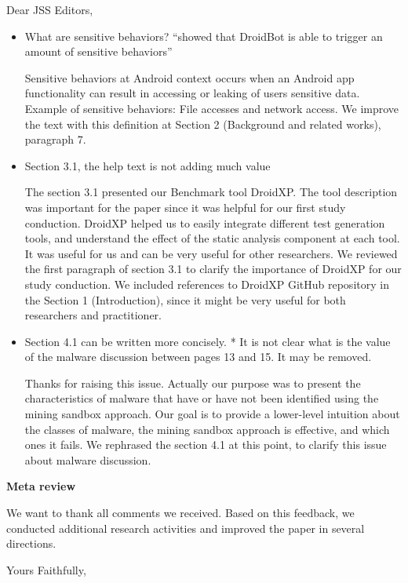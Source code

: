 \documentclass[12pt,english]{scrartcl}
\begin{document}
\begin{letter}{Dear JSS Editors,}
\begin{itemize}
\vspace{0.2cm}

\item What are sensitive behaviors? ``showed that DroidBot is able to trigger an amount of sensitive behaviors''

\vspace{0.2cm}

{\color{blue}{\bf Answer.} Sensitive behaviors at Android context occurs when an Android app functionality can result in accessing or leaking of users sensitive data. Example of sensitive behaviors: File accesses and network access. We improve the text with this definition at Section 2 (Background and related works), paragraph 7.}

\vspace{0.2cm}

\item Section 3.1, the help text is not adding much value

\vspace{0.2cm}

{\color{blue}{\bf Answer.} The section 3.1 presented our Benchmark tool DroidXP. The tool description was important for the paper since it was helpful for our first study conduction. DroidXP helped us to easily integrate different test generation tools, and understand the effect of the static analysis component at each tool. It was useful for us and can be very useful for other researchers. We reviewed the first paragraph of section 3.1 to clarify the importance of DroidXP for our study conduction. We included references to DroidXP GitHub repository in the Section 1 (Introduction), since it might be very useful for both researchers and practitioner.}


\vspace{0.2cm}

\item Section 4.1 can be written more concisely.
* It is not clear what is the value of the malware discussion between pages 13 and 15. It may be removed.

\vspace{0.2cm}

{\color{blue}{\bf Answer.} Thanks for raising this issue. Actually our purpose was to present the characteristics of malware that have or have not been identified using the mining sandbox approach. Our goal is to provide a lower-level intuition about the classes of malware, the mining sandbox approach is effective, and which ones it fails. We rephrased the section 4.1 at this point, to clarify this issue about malware discussion.}


\end{itemize}



{\bf Meta review}

We want to thank all comments we received. Based on this feedback, we conducted additional research activities and improved the paper in several directions.

\closing{Yours Faithfully,}





\end{letter}
\end{document}
